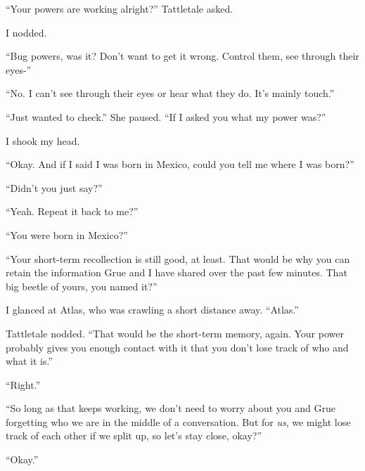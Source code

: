 





``Your powers are working alright?'' Tattletale asked.



I nodded.



``Bug powers, was it?  Don't want to get it wrong.  Control them, see through their eyes-''



``No.  I can't see through their eyes or hear what they do.  It's mainly touch.''



``Just wanted to check.''  She paused.  ``If I asked you what my power was?''



I shook my head.



``Okay.  And if I said I was born in Mexico, could you tell me where I was born?''



``Didn't you just say?''



``Yeah.  Repeat it back to me?''



``You were born in Mexico?''



``Your short-term recollection is still good, at least.  That would be why you can retain the information Grue and I have shared over the past few minutes.  That big beetle of yours, you named it?''



I glanced at Atlas, who was crawling a short distance away.  ``Atlas.''



Tattletale nodded.  ``That would be the short-term memory, again. Your power probably gives you enough contact with it that you don't lose track of who and what it is.''



``Right.''



``So long as that keeps working, we don't need to worry about you and Grue forgetting who we are in the middle of a conversation.  But for \emph{us}, we might lose track of each other if we split up, so let's stay close, okay?''



``Okay.''



